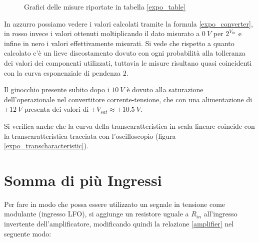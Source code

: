 \begin{figure}[H]
\begin{subfigure}{.5\textwidth}
    \end{subfigure}

    \caption{Grafici delle misure riportate in tabella \ref{expo_table}}
    \label{expo_graphs}
\end{figure}

In azzurro possiamo vedere i valori calcolati tramite la formula \ref{expo_converter},
in rosso invece i valori ottenuti moltiplicando il dato misurato a $0\ V$ per $2^{V_{in}}$
e infine in nero i valori effettivamente misurati. Si vede che rispetto a quanto calcolato
c'è un lieve discostamento dovuto con ogni probabilità alla tolleranza dei valori dei
componenti utilizzati, tuttavia le misure risultano quasi coincidenti con la curva esponenziale
di pendenza $2$.

Il ginocchio presente subito dopo i $10\ V$ è dovuto alla saturazione dell'operazionale
nel convertitore corrente-tensione, che con una alimentazione di $\pm12\ V$ presenta dei
valori di $\pm V_{sat}\approx\pm10.5\ V$.

Si verifica anche che la curva della transcaratteristica in scala lineare coincide con la
transcaratteristica tracciata con l'oscilloscopio (figura \ref{expo_transcharacteristic}).


\section{Somma di più Ingressi}


Per fare in modo che possa essere utilizzato un segnale in tensione come modulante (ingresso
LFO), si aggiunge un resistore uguale a $R_{in}$ all'ingresso invertente dell'amplificatore,
modificando quindi la relazione \ref{amplifier} nel seguente modo:

